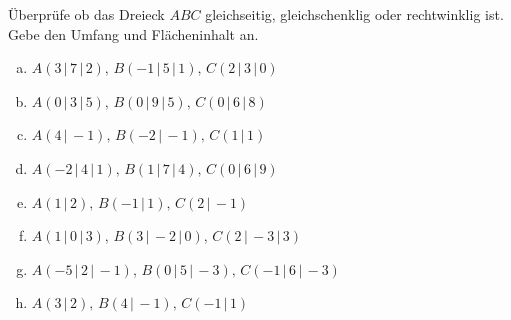 \documentclass[a4paper,12pt]{article}
\newcommand{\Aufgabe}[2]{
	{
		\vspace*{0.3cm}
		\begin{tcolorbox}[breakable,colback=yellow!0,colframe=black!65!white,title=\textbf{Aufgabe #1:},width=\linewidth ]
			{#2}
		\end{tcolorbox}
		
		
	}
}
\begin{document}
	\Aufgabe{3.8.2 (Dreiecke)}{
		Überprüfe ob das Dreieck $ABC$ gleichseitig, gleichschenklig oder rechtwinklig ist.
		Gebe den Umfang und Flächeninhalt an.		
		\begin{enumerate}[(a)]
			\item $A( 3\,|\,7 \,|\,2 ),\, B( -1\,|\,5 \,|\,1 ),\,C(2 \,|\,3 \,|\,0 )$
			\item $A( 0\,|\,3 \,|\,5 ),\, B( 0\,|\,9 \,|\,5 ),\,C(0 \,|\,6 \,|\,8)$
			\item $A( 4\,|\,-1 ),\, B( -2\,|\,-1),\,C( 1\,|\,1)$
			\item $A( -2\,|\,4 \,|\,1 ),\, B( 1\,|\,7 \,|\,4 ),\,C( 0\,|\,6 \,|\,9 )$
			\item $A( 1 \,|\,2 ),\, B( -1\,|\,1),\,C( 2\,|\,-1)$
			\item $A( 1\,|\,0 \,|\,3 ),\, B( 3\,|\,-2 \,|\,0 ),\,C( 2\,|\, -3\,|\,3 )$
			\item $A( -5\,|\, 2\,|\,-1 ),\, B( 0\,|\, 5\,|\,-3 ),\,C(-1 \,|\,6 \,|\, -3)$
			\item $A( 3\,|\,2 ),\, B( 4\,|\,-1),\,C( -1\,|\,1)$
		\end{enumerate}
		
	}
	\newpage
\end{document}
